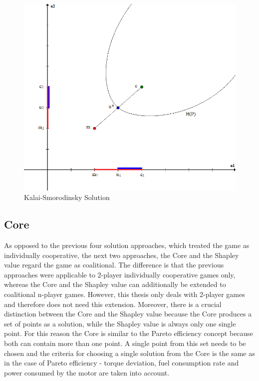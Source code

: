 {\begin{figure}[h]
\centering
\includegraphics[scale=0.4]{figures/kalaiSmorodinskySolution}
\caption{Kalai-Smorodinsky Solution}
\label{fig:ksSol}
\end{figure}

\subsection{Core}
\label{subsec:core}
As opposed to the previous four solution approaches, which treated the game as individually cooperative, the next two approaches, the Core and the Shapley value regard the game as coalitional. The difference is that the previous approaches were applicable to 2-player individually cooperative games only, whereas the Core and the Shapley value can additionally be extended to coalitional n-player games. However, this thesis only deals with 2-player games and therefore does not need this extension. Moreover, there is a crucial distinction between the Core and the Shapley value because the Core produces a set of points as a solution, while the Shapley value is always only one single point. For this reason the Core is similar to the Pareto efficiency concept because both can contain more than one point. A single point from this set needs to be chosen and the criteria for choosing a single solution from the Core is the same as in the case of Pareto efficiency - torque deviation, fuel consumption rate and power consumed by the motor are taken into account.

}
